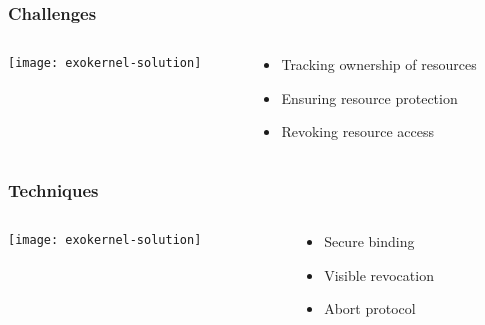 \begin{frame}[plain]
	\frametitle{Challenges}
	
	
	
	\begin{columns}
		
		\begin{column}{.5\textwidth}
			
			\texttt{[image: exokernel-solution]}
			
		\end{column}
		
		\begin{column}{.5\textwidth}
			
						\Large
			\begin{itemize}
				\item Tracking ownership of resources
				\item Ensuring resource protection
				\item Revoking resource access
				
			\end{itemize}	
		\end{column}
		
		
	\end{columns}
	
\end{frame}


\begin{frame}[plain]
	\frametitle{Techniques}
	
	
	
	\begin{columns}
		
		\begin{column}{.5\textwidth}
			
			\texttt{[image: exokernel-solution]}
			
		\end{column}
		
		\begin{column}{.5\textwidth}
			
			\Large
			\begin{itemize}
				\item Secure binding
				\item Visible revocation
				\item Abort protocol
				
			\end{itemize}	
		\end{column}
		
		
	\end{columns}
	
\end{frame}



